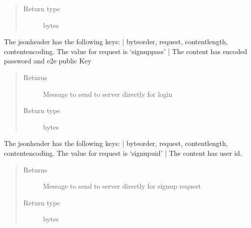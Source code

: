 \documentclass[letterpaper,10pt,english]{sphinxmanual}
\begin{document}
\begin{fulllineitems}
\begin{fulllineitems}
\begin{quote}
\begin{description}
\item[{Return type}] \leavevmode
bytes

\end{description}\end{quote}

\end{fulllineitems}


\begin{fulllineitems}
\label{\detokenize{Message:Message.Message._create_signuppass_request}}
The jsonheader has the following keys: |
byteorder, request, content\sphinxhyphen{}length, content\sphinxhyphen{}encoding. The value for request is ‘signuppass’ |
The content has encoded password and e2e public Key
\begin{quote}\begin{description}
\item[{Returns}] \leavevmode
Message to send to server directly for login

\item[{Return type}] \leavevmode
bytes

\end{description}\end{quote}

\end{fulllineitems}


\begin{fulllineitems}
\label{\detokenize{Message:Message.Message._create_signupuid_request}}
The jsonheader has the following keys: |
byteorder, request, content\sphinxhyphen{}length, content\sphinxhyphen{}encoding. The value for request is ‘signupuid’ |
The content has user id.
\begin{quote}\begin{description}
\item[{Returns}] \leavevmode
Message to send to server directly for signup request

\item[{Return type}] \leavevmode
bytes


\end{description}
\end{quote}
\end{fulllineitems}
\end{fulllineitems}
\end{document}
